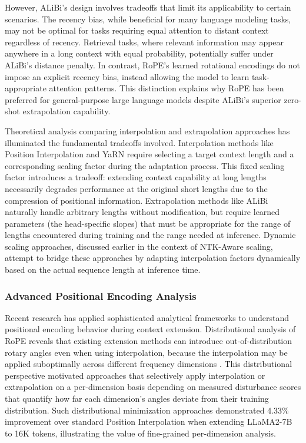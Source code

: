 \documentclass[11pt,letterpaper]{article}
\begin{document}
However, ALiBi's design involves tradeoffs that limit its applicability to certain scenarios. The recency bias, while beneficial for many language modeling tasks, may not be optimal for tasks requiring equal attention to distant context regardless of recency. Retrieval tasks, where relevant information may appear anywhere in a long context with equal probability, potentially suffer under ALiBi's distance penalty. In contrast, RoPE's learned rotational encodings do not impose an explicit recency bias, instead allowing the model to learn task-appropriate attention patterns. This distinction explains why RoPE has been preferred for general-purpose large language models despite ALiBi's superior zero-shot extrapolation capability.

Theoretical analysis comparing interpolation and extrapolation approaches has illuminated the fundamental tradeoffs involved. Interpolation methods like Position Interpolation and YaRN require selecting a target context length and a corresponding scaling factor during the adaptation process. This fixed scaling factor introduces a tradeoff: extending context capability at long lengths necessarily degrades performance at the original short lengths due to the compression of positional information. Extrapolation methods like ALiBi naturally handle arbitrary lengths without modification, but require learned parameters (the head-specific slopes) that must be appropriate for the range of lengths encountered during training and the range needed at inference. Dynamic scaling approaches, discussed earlier in the context of NTK-Aware scaling, attempt to bridge these approaches by adapting interpolation factors dynamically based on the actual sequence length at inference time.

\subsubsection{Advanced Positional Encoding Analysis}

Recent research has applied sophisticated analytical frameworks to understand positional encoding behavior during context extension. Distributional analysis of RoPE reveals that existing extension methods can introduce out-of-distribution rotary angles even when using interpolation, because the interpolation may be applied suboptimally across different frequency dimensions \cite{zhang2024distributional}. This distributional perspective motivated approaches that selectively apply interpolation or extrapolation on a per-dimension basis depending on measured disturbance scores that quantify how far each dimension's angles deviate from their training distribution. Such distributional minimization approaches demonstrated 4.33\% improvement over standard Position Interpolation when extending LLaMA2-7B to 16K tokens, illustrating the value of fine-grained per-dimension analysis.
\end{document}
